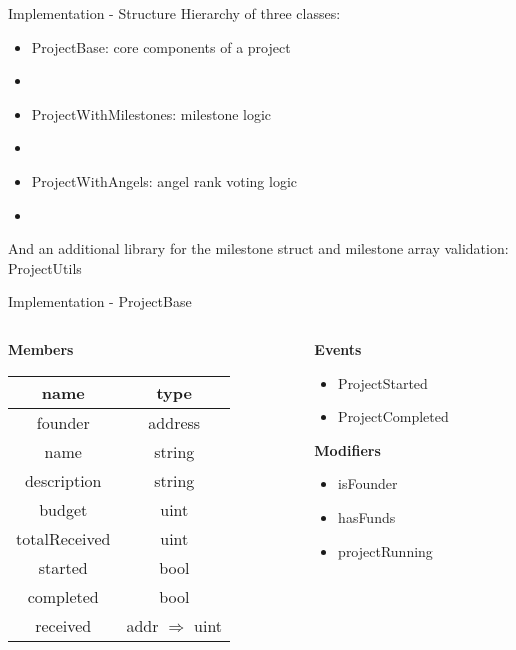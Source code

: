 \documentclass{beamer}
\begin{document}
\begin{frame}{Implementation - Structure}
Hierarchy of three classes:\\
\vspace{7mm}
\begin{itemize}
	\item ProjectBase: core components of a project
	\item[]
	\item ProjectWithMilestones: milestone logic
	\item[]
	\item ProjectWithAngels: angel rank voting logic
	\item[]
\end{itemize}
And an additional library for the milestone struct and milestone array validation: ProjectUtils
\end{frame}

\begin{frame}{Implementation - ProjectBase}
\begin{columns}
\begin{column}{0.55\textwidth}
\begin{center}
\textbf{Members}\\
\vspace{3mm}
	\begin{tabular}{c|c}
		name & type \\
		\hline
		 founder & address \\
		 name & string \\
		 description & string \\
		 budget & uint \\
		 totalReceived & uint \\
		 started & bool \\
		 completed & bool \\
		 received & addr $\Rightarrow$ uint \\
	\end{tabular}
\end{center}
\end{column}
\begin{column}{0.45\textwidth}
\begin{center}
\textbf{Events}\\
\vspace{1mm}
\begin{itemize}
	\item ProjectStarted
	\item ProjectCompleted
\end{itemize}
\vspace{8mm}
\textbf{Modifiers}\\
\vspace{1mm}
\begin{itemize}
	\item isFounder
	\item hasFunds
	\item projectRunning
\end{itemize}
\end{center}
\end{column}
\end{columns}
\end{frame}
\end{document}
